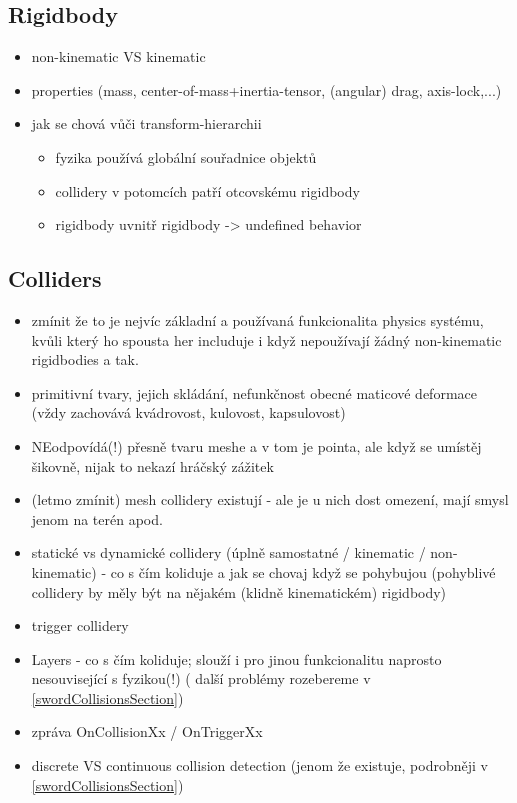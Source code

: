 \subsection{Rigidbody}
\begin{itemize}
    \item non-kinematic VS kinematic
    \item properties (mass, center-of-mass+inertia-tensor, (angular) drag, axis-lock,...)
    \item jak se chová vůči transform-hierarchii
          \begin{itemize}
            \item fyzika používá globální souřadnice objektů
            \item collidery v potomcích patří otcovskému rigidbody
            \item rigidbody uvnitř rigidbody -> undefined behavior
          \end{itemize}
\end{itemize}

\subsection{Colliders}
\begin{itemize}
    \item zmínit že to je nejvíc základní a používaná funkcionalita physics systému, kvůli který ho spousta her includuje i když nepoužívají žádný non-kinematic rigidbodies a tak.  
    \item primitivní tvary, jejich skládání, nefunkčnost obecné maticové deformace (vždy zachovává kvádrovost, kulovost, kapsulovost)
    \item NEodpovídá(!) přesně tvaru meshe a v tom je pointa, ale když se umístěj šikovně, nijak to nekazí hráčský zážitek
    \item (letmo zmínit) mesh collidery existují - ale je u nich dost omezení, mají smysl jenom na terén apod.
    \item statické vs dynamické collidery (úplně samostatné / kinematic / non-kinematic) - co s čím koliduje a jak se chovaj když se pohybujou (pohyblivé collidery by měly být na nějakém (klidně kinematickém) rigidbody)
    \item trigger collidery
    \item Layers - co s čím koliduje; slouží i pro jinou funkcionalitu naprosto nesouvisející s fyzikou(!) ( další problémy rozebereme v \ref{swordCollisionsSection})
    \item zpráva OnCollisionXx / OnTriggerXx
    \item discrete VS continuous collision detection (jenom že existuje, podrobněji v \ref{swordCollisionsSection})
\end{itemize}

